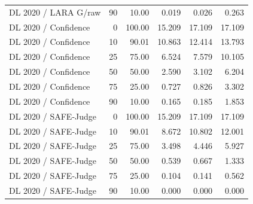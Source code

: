 \begin{longtable}{@{}lrrrrr@{}}
DL 2020 / LARA G/raw & 90 & 10.00 & 0.019 & 0.026 & 0.263 \\
DL 2020 / Confidence & 0 & 100.00 & 15.209 & 17.109 & 17.109 \\
DL 2020 / Confidence & 10 & 90.01 & 10.863 & 12.414 & 13.793 \\
DL 2020 / Confidence & 25 & 75.00 & 6.524 & 7.579 & 10.105 \\
DL 2020 / Confidence & 50 & 50.00 & 2.590 & 3.102 & 6.204 \\
DL 2020 / Confidence & 75 & 25.00 & 0.727 & 0.826 & 3.302 \\
DL 2020 / Confidence & 90 & 10.00 & 0.165 & 0.185 & 1.853 \\
DL 2020 / SAFE-Judge & 0 & 100.00 & 15.209 & 17.109 & 17.109 \\
DL 2020 / SAFE-Judge & 10 & 90.01 & 8.672 & 10.802 & 12.001 \\
DL 2020 / SAFE-Judge & 25 & 75.00 & 3.498 & 4.446 & 5.927 \\
DL 2020 / SAFE-Judge & 50 & 50.00 & 0.539 & 0.667 & 1.333 \\
DL 2020 / SAFE-Judge & 75 & 25.00 & 0.104 & 0.141 & 0.562 \\
DL 2020 / SAFE-Judge & 90 & 10.00 & 0.000 & 0.000 & 0.000 \\
\bottomrule
\end{longtable}
